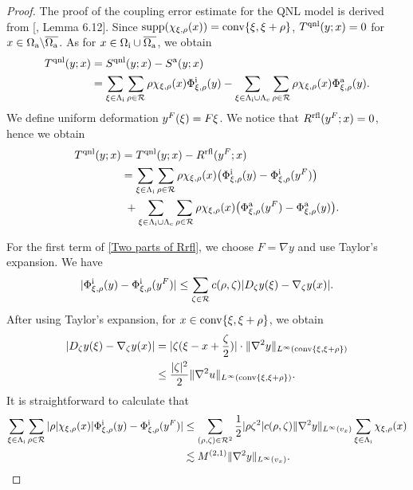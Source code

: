 \begin{proof}
	The proof of the coupling error estimate for the QNL model is derived from [\cite{2013_ML_CO_AC_Coupling_ACTANUM}, Lemma 6.12]. Since $\text{supp}(\chi_{\xi,\rho}(x)) = {\rm conv}\{\xi,\xi+\rho\}$, $T^{{\rm qnl}}(y;x)=0$ for $x\in\Omega_{{\rm a}} \backslash \overline{\Omega_{{\rm a}}}$. As for $x\in \Omega_{{\rm i}} \cup \overline{\Omega_{{\rm a}}}$, we obtain
	\begin{align*}
		T^{{\rm qnl}}(y;x) &=S^{{\rm qnl}}(y;x)-S^{{\rm a}}(y;x)\\
		&=\sum_{\xi \in \Lambda_{\rm i}} \sum_{\rho \in \mathcal{R}}\rho\chi_{\xi,\rho}(x)\Phi^{{\rm i}}_{\xi,\rho}(y)-\sum_{\xi \in\Lambda_{\rm i}\cup\Lambda_{\rm c}}\sum_{\rho \in \mathcal{R}} \rho \chi_{\xi,\rho}(x) \Phi^{{\rm a}}_{\xi,\rho}(y).
	\end{align*}
	We define uniform deformation $y^{F}(\xi)=F\xi$. We notice that $R^{\text{rfl}}(y^{F};x)=0$, hence we obtain
	\begin{equation}\label{Two parts of Rrfl}
		\begin{aligned}
			T^{{\rm qnl}}(y;x) &= T^{{\rm qnl}}(y;x)-R^{\text{rfl}}(y^{F};x)\\
			&= \sum_{\xi \in \Lambda_{\rm i}} \sum_{\rho \in \mathcal{R}}\rho\chi_{\xi,\rho}(x)\big(\Phi^{{\rm i}}_{\xi,\rho}(y)-\Phi^{{\rm i}}_{\xi,\rho}(y^{F})\big)\\
			&\ +\sum_{\xi \in\Lambda_{\rm i}\cup\Lambda_{\rm c}}\sum_{\rho \in \mathcal{R}} \rho \chi_{\xi,\rho}(x) \big(\Phi^{{\rm a}}_{\xi,\rho}(y^{F})-\Phi^{{\rm a}}_{\xi,\rho}(y)\big).
		\end{aligned}
	\end{equation}
	
	For the first term of \eqref{Two parts of Rrfl}, we choose $F=\nabla y$ and use Taylor's expansion. We have
	\begin{equation}\label{Interface stess}
		\vert \Phi^{{\rm i}}_{\xi,\rho}(y)-\Phi^{{\rm i}}_{\xi,\rho}(y^{F}) \vert \le \sum_{\zeta \in \mathcal{R}} c(\rho,\zeta)\vert D_{\zeta}y(\xi)-\nabla_{\zeta}y(x)\vert.
	\end{equation}
	After using Taylor's expansion, for $x\in {\rm conv}\{\xi,\xi+\rho\}$, we obtain
	\begin{align*}
		\vert D_{\zeta}y(\xi)-\nabla_{\zeta}y(x)\vert&= \vert \zeta(\xi-x+\frac{\zeta}{2})\vert \cdot \Vert \nabla^{2}y\Vert_{L^{\infty}({\rm conv}\{\xi,\xi+\rho\})}\\
		&\le\frac{\vert \zeta \vert^{2}}{2}\Vert \nabla^{2}u\Vert_{L^{\infty}({\rm conv}\{\xi,\xi+\rho\})}.
	\end{align*}
	It is straightforward to calculate that
	\begin{align*}
		\sum_{\xi \in \Lambda_{\rm i}} \sum_{\rho \in \mathcal{R}} \vert\rho \vert\chi_{\xi,\rho}(x) \vert \Phi^{{\rm i}}_{\xi,\rho}(y)-\Phi^{{\rm i}}_{\xi,\rho}(y^{F}) \vert &\le \sum_{(\rho,\zeta)\in\mathcal{R}^{2}} \frac{1}{2}\vert \rho \zeta^{2}\vert c(\rho,\zeta) \Vert \nabla^{2}y\Vert_{L^{\infty}(v_{x})}\sum_{\xi \in \Lambda_{\rm i}}\chi_{\xi,\rho}(x)\\
		&\lesssim M^{(2,1)}\Vert \nabla^{2}y\Vert_{L^{\infty}(v_{x})}.
	\end{align*}
	

\end{proof}
